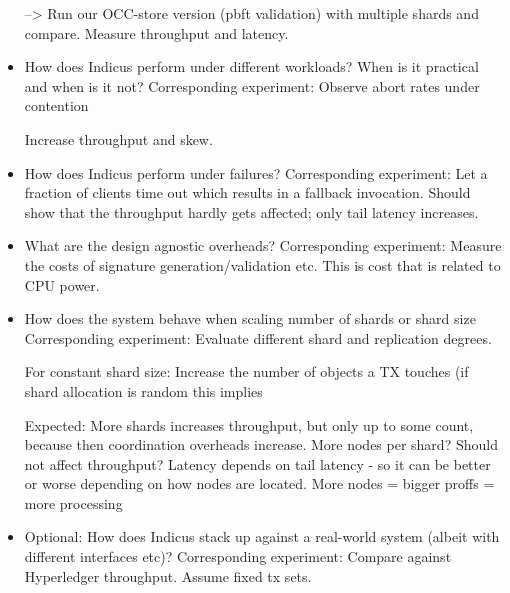 \begin{itemize}
--> Run our OCC-store version (pbft validation) with multiple shards and compare. Measure throughput and latency.

\item How does Indicus perform under different workloads? When is it practical and when is it not?
Corresponding experiment: Observe abort rates under contention

Increase throughput and skew. 


\item How does Indicus perform under failures?
Corresponding experiment: Let a fraction of clients time out which results in a fallback invocation. Should show that the throughput hardly gets affected; only tail latency increases.

\item What are the design agnostic overheads?
Corresponding experiment: Measure the costs of signature generation/validation etc. This is cost that is related to CPU power.

\item How does the system behave when scaling number of shards or shard size
Corresponding experiment: Evaluate different shard and replication degrees.

For constant shard size: Increase the number of objects a TX touches (if shard allocation is random this implies 

Expected: More shards increases throughput, but only up to some count, because then coordination overheads increase. More nodes per shard? Should not affect throughput? Latency depends on tail latency - so it can be better or worse depending on how nodes are located. More nodes = bigger proffs = more processing
\item Optional: How does Indicus stack up against a real-world system (albeit with different interfaces etc)?
Corresponding experiment: Compare against Hyperledger throughput. Assume fixed tx sets.
\end{itemize}

\fi


